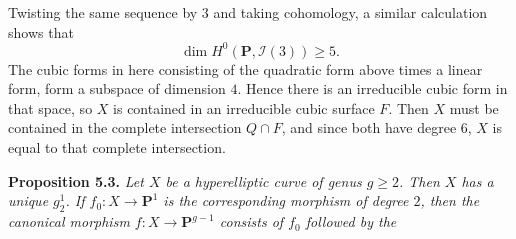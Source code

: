 {Twisting the same sequence by $3$ and taking cohomology, a similar calculation shows that
\[
\dim H^0(\mathbf P,\mathcal I(3))\ge5.
\]
The cubic forms in here consisting of the quadratic form above times a linear form, form a subspace of dimension $4$. Hence there is an irreducible cubic form in that space, so $X$ is contained in an irreducible cubic surface $F$. Then $X$ must be contained in the complete intersection $Q\cap F$, and since both have degree $6$, $X$ is equal to that complete intersection.

\medskip
\noindent\hypertarget{result-IV-5.3}{}\textbf{Proposition 5.3.} \emph{Let $X$ be a hyperelliptic curve of genus $g\ge2$. Then $X$ has a unique $g_2^1$. If $f_0\colon X\to\mathbf P^1$ is the corresponding morphism of degree $2$, then the canonical morphism $f\colon X\to\mathbf P^{g-1}$ consists of $f_0$ followed by the}}
